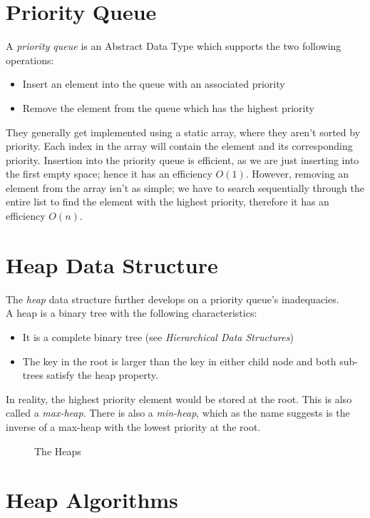 
\section{Priority Queue}
A \textit{priority queue} is an Abstract Data Type which supports the two following operations:
\begin{itemize}
    \item Insert an element into the queue with an associated priority
    \item Remove the element from the queue which has the highest priority
\end{itemize}
They generally get implemented using a static array, where they aren't sorted by priority. Each index in the array will contain the element and its corresponding priority. Insertion into the priority queue is efficient, as we are just inserting into the first empty space; hence it has an efficiency $O(1)$. However, removing an element from the array isn't as simple; we have to search sequentially through the entire list to find the element with the highest priority, therefore it has an efficiency $O(n)$. 

\section{Heap Data Structure}
The \textit{heap} data structure further develops on a priority queue's inadequacies.\\

A heap is a binary tree with the following characteristics:
\begin{itemize}
    \item It is a complete binary tree (see \textit{Hierarchical Data Structures})
    \item The key in the root is larger than the key in either child node and both sub-trees satisfy the heap property.
\end{itemize}
In reality, the highest priority element would be stored at the root. This is also called a \textit{max-heap}. There is also a \textit{min-heap}, which as the name suggests is the inverse of a max-heap with the lowest priority at the root. 
\begin{figure}[H]
    \centering
    
    \caption{The Heaps}
\end{figure}
\section{Heap Algorithms}
